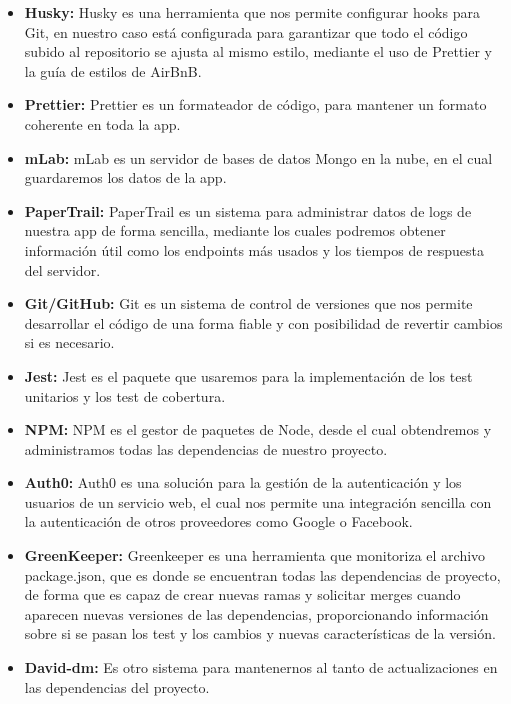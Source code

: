 \begin{itemize}
  \item \textbf{Husky:} Husky es una herramienta que nos permite configurar hooks para Git, en nuestro caso está configurada para garantizar que todo el código subido al repositorio se ajusta al mismo estilo, mediante el uso de Prettier y la guía de estilos de AirBnB.
  
  \item \textbf{Prettier:} Prettier es un formateador de código, para mantener un formato coherente en toda la app. 
  
  \item \textbf{mLab:} mLab es un servidor de bases de datos Mongo en la nube, en el cual guardaremos los datos de la app.
  
  \item \textbf{PaperTrail:} PaperTrail es un sistema para administrar datos de logs de nuestra app de forma sencilla, mediante los cuales podremos obtener información útil como los endpoints más usados y los tiempos de respuesta del servidor.
  
  \item \textbf{Git/GitHub:} Git es un sistema de control de versiones que nos permite desarrollar el código de una forma fiable y con posibilidad de revertir cambios si es necesario.

  \item \textbf{Jest:} Jest es el paquete que usaremos para la implementación de los test unitarios y los test de cobertura.
  
  \item \textbf{NPM:} NPM es el gestor de paquetes de Node, desde el cual obtendremos y administramos todas las dependencias de nuestro proyecto.
  
  \item \textbf{Auth0:} Auth0 es una solución para la gestión de la autenticación y los usuarios de un servicio web, el cual nos permite una integración sencilla con la autenticación de otros proveedores como Google o Facebook.
  
  \item \textbf{GreenKeeper:} Greenkeeper es una herramienta que monitoriza el archivo package.json, que es donde se encuentran todas las dependencias de proyecto, de forma que es capaz de crear nuevas ramas y solicitar merges cuando aparecen nuevas versiones de las dependencias, proporcionando información sobre si se pasan los test y los cambios y nuevas características de la versión.
  
  \item \textbf{David-dm:} Es otro sistema para mantenernos al tanto de actualizaciones en las dependencias del proyecto.
  

\end{itemize}

